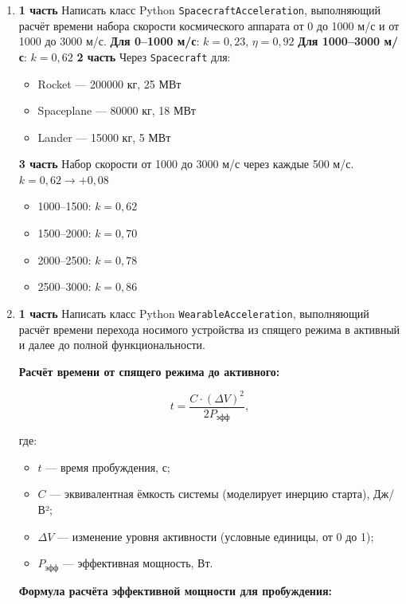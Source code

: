\begin{enumerate}
    \item[17] \textbf{1 часть}  
    Написать класс Python \texttt{SpacecraftAcceleration}, выполняющий расчёт времени набора скорости космического аппарата от 0 до 1000 м/с и от 1000 до 3000 м/с.  
    \textbf{Для 0–1000 м/с}: $k = 0{,}23$, $\eta = 0{,}92$  
    \textbf{Для 1000–3000 м/с}: $k = 0{,}62$  
    \textbf{2 часть}  
    Через \texttt{Spacecraft} для:  
    \begin{itemize}
        \item Rocket — 200000 кг, 25 МВт  
        \item Spaceplane — 80000 кг, 18 МВт  
        \item Lander — 15000 кг, 5 МВт  
    \end{itemize}
    \textbf{3 часть}  
    Набор скорости от 1000 до 3000 м/с через каждые 500 м/с. $k = 0{,}62 \to +0{,}08$  
    \begin{itemize}
        \item 1000–1500: $k = 0{,}62$  
        \item 1500–2000: $k = 0{,}70$  
        \item 2000–2500: $k = 0{,}78$  
        \item 2500–3000: $k = 0{,}86$  
    \end{itemize}


\item[18] \textbf{1 часть}  
Написать класс Python \texttt{WearableAcceleration}, выполняющий расчёт времени перехода носимого устройства из спящего режима в активный и далее до полной функциональности.

\textbf{Расчёт времени от спящего режима до активного:}

\begin{equation}
t = \frac{C \cdot (\Delta V)^2}{2P_{\text{эфф}}},
\end{equation}

где:  
\begin{itemize}
    \item $t$ — время пробуждения, с;  
    \item $C$ — эквивалентная ёмкость системы (моделирует инерцию старта), Дж/В²;  
    \item $\Delta V$ — изменение уровня активности (условные единицы, от 0 до 1);  
    \item $P_{\text{эфф}}$ — эффективная мощность, Вт.  
\end{itemize}

\textbf{Формула расчёта эффективной мощности для пробуждения:}


\end{enumerate}
